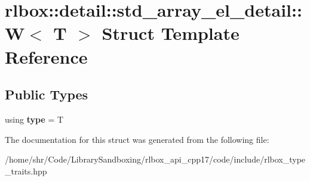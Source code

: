 \hypertarget{structrlbox_1_1detail_1_1std__array__el__detail_1_1W}{}\section{rlbox\+:\+:detail\+:\+:std\+\_\+array\+\_\+el\+\_\+detail\+:\+:W$<$ T $>$ Struct Template Reference}
\label{structrlbox_1_1detail_1_1std__array__el__detail_1_1W}
\subsection*{Public Types}
\begin{DoxyCompactItemize}
\item 
\mbox{\label{structrlbox_1_1detail_1_1std__array__el__detail_1_1W_a40a0b72602d7250352c6adc3947e8ccc}} 
using {\bfseries type} = T
\end{DoxyCompactItemize}


The documentation for this struct was generated from the following file\+:\begin{DoxyCompactItemize}
\item 
/home/shr/\+Code/\+Library\+Sandboxing/rlbox\+\_\+api\+\_\+cpp17/code/include/rlbox\+\_\+type\+\_\+traits.\+hpp\end{DoxyCompactItemize}

